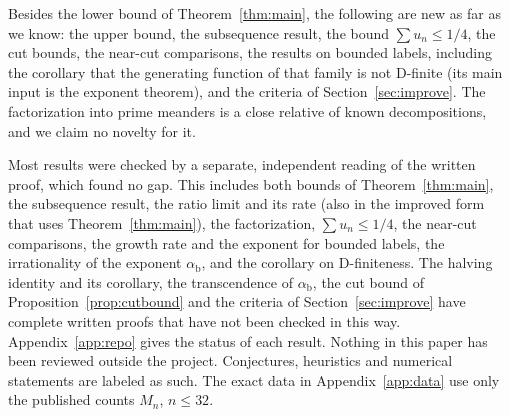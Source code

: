 Besides the lower bound of Theorem~\ref{thm:main}, the following are new as far as we know: the upper bound, the
subsequence result, the bound $\sum u_n\le1/4$, the cut bounds, the near-cut comparisons, the
results on bounded labels, including the corollary that the generating function of that family is not
D-finite (its main input is the exponent theorem), and the criteria of Section~\ref{sec:improve}. The
factorization into prime meanders is a close relative of known decompositions, and we claim no novelty for it.

Most results were checked by a separate, independent reading of the written proof, which found no
gap. This includes both bounds of Theorem~\ref{thm:main}, the subsequence result, the ratio limit and
its rate (also in the improved form that uses Theorem~\ref{thm:main}), the factorization,
$\sum u_n\le1/4$, the near-cut comparisons, the growth rate and the exponent for bounded labels, the
irrationality of the exponent $\alpha_{\mathrm b}$, and the corollary on D-finiteness. The halving
identity and its corollary, the transcendence of $\alpha_{\mathrm b}$, the cut bound of
Proposition~\ref{prop:cutbound} and the criteria of Section~\ref{sec:improve} have complete written
proofs that have not been checked in this way.
Appendix~\ref{app:repo} gives the status of each result. Nothing in this paper has been reviewed
outside the project. Conjectures, heuristics and numerical statements are labeled as such. The exact
data in Appendix~\ref{app:data} use only the published counts $M_n$, $n\le32$.
